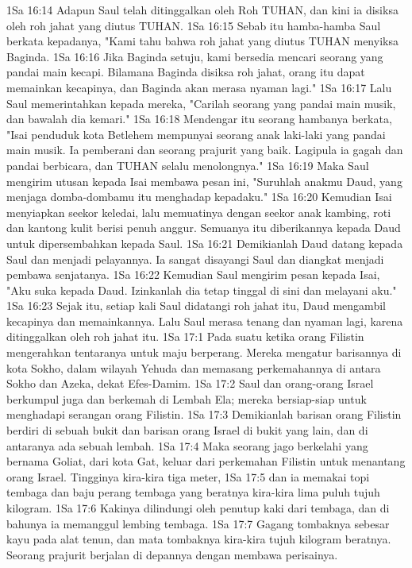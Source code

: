 1Sa 16:14  Adapun Saul telah ditinggalkan oleh Roh TUHAN, dan kini ia disiksa oleh roh jahat yang diutus TUHAN.
1Sa 16:15  Sebab itu hamba-hamba Saul berkata kepadanya, "Kami tahu bahwa roh jahat yang diutus TUHAN menyiksa Baginda.
1Sa 16:16  Jika Baginda setuju, kami bersedia mencari seorang yang pandai main kecapi. Bilamana Baginda disiksa roh jahat, orang itu dapat memainkan kecapinya, dan Baginda akan merasa nyaman lagi."
1Sa 16:17  Lalu Saul memerintahkan kepada mereka, "Carilah seorang yang pandai main musik, dan bawalah dia kemari."
1Sa 16:18  Mendengar itu seorang hambanya berkata, "Isai penduduk kota Betlehem mempunyai seorang anak laki-laki yang pandai main musik. Ia pemberani dan seorang prajurit yang baik. Lagipula ia gagah dan pandai berbicara, dan TUHAN selalu menolongnya."
1Sa 16:19  Maka Saul mengirim utusan kepada Isai membawa pesan ini, "Suruhlah anakmu Daud, yang menjaga domba-dombamu itu menghadap kepadaku."
1Sa 16:20  Kemudian Isai menyiapkan seekor keledai, lalu memuatinya dengan seekor anak kambing, roti dan kantong kulit berisi penuh anggur. Semuanya itu diberikannya kepada Daud untuk dipersembahkan kepada Saul.
1Sa 16:21  Demikianlah Daud datang kepada Saul dan menjadi pelayannya. Ia sangat disayangi Saul dan diangkat menjadi pembawa senjatanya.
1Sa 16:22  Kemudian Saul mengirim pesan kepada Isai, "Aku suka kepada Daud. Izinkanlah dia tetap tinggal di sini dan melayani aku."
1Sa 16:23  Sejak itu, setiap kali Saul didatangi roh jahat itu, Daud mengambil kecapinya dan memainkannya. Lalu Saul merasa tenang dan nyaman lagi, karena ditinggalkan oleh roh jahat itu.
1Sa 17:1  Pada suatu ketika orang Filistin mengerahkan tentaranya untuk maju berperang. Mereka mengatur barisannya di kota Sokho, dalam wilayah Yehuda dan memasang perkemahannya di antara Sokho dan Azeka, dekat Efes-Damim.
1Sa 17:2  Saul dan orang-orang Israel berkumpul juga dan berkemah di Lembah Ela; mereka bersiap-siap untuk menghadapi serangan orang Filistin.
1Sa 17:3  Demikianlah barisan orang Filistin berdiri di sebuah bukit dan barisan orang Israel di bukit yang lain, dan di antaranya ada sebuah lembah.
1Sa 17:4  Maka seorang jago berkelahi yang bernama Goliat, dari kota Gat, keluar dari perkemahan Filistin untuk menantang orang Israel. Tingginya kira-kira tiga meter,
1Sa 17:5  dan ia memakai topi tembaga dan baju perang tembaga yang beratnya kira-kira lima puluh tujuh kilogram.
1Sa 17:6  Kakinya dilindungi oleh penutup kaki dari tembaga, dan di bahunya ia memanggul lembing tembaga.
1Sa 17:7  Gagang tombaknya sebesar kayu pada alat tenun, dan mata tombaknya kira-kira tujuh kilogram beratnya. Seorang prajurit berjalan di depannya dengan membawa perisainya.
